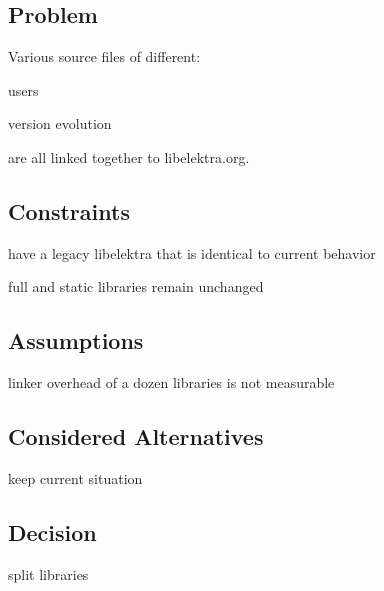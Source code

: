 \subsection*{Problem}

Various source files of different\+:


\begin{DoxyItemize}
\item users
\item version evolution
\end{DoxyItemize}

are all linked together to libelektra.\+org.

\subsection*{Constraints}


\begin{DoxyItemize}
\item have a legacy libelektra that is identical to current behavior
\item full and static libraries remain unchanged
\end{DoxyItemize}

\subsection*{Assumptions}


\begin{DoxyItemize}
\item linker overhead of a dozen libraries is not measurable
\end{DoxyItemize}

\subsection*{Considered Alternatives}


\begin{DoxyItemize}
\item keep current situation
\end{DoxyItemize}

\subsection*{Decision}


\begin{DoxyItemize}
\item split libraries
\end{DoxyItemize}

